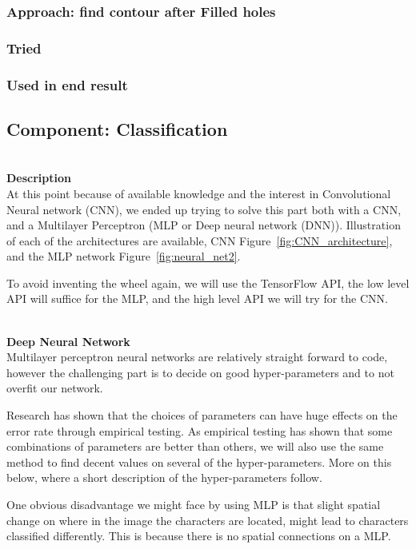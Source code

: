 \documentclass[11pt,a4paper,UKenglish]{article}
\begin{document}
\subsubsection{Approach: find contour after Filled holes}




\subsubsection{Tried}
\subsubsection{Used in end result}

\subsection{Component: Classification}
\label{Method:Classification}
\noindent \\ \textbf{Description}
\noindent \\ At this point because of available knowledge and the interest in
Convolutional Neural network (CNN), we ended up trying to solve this part
both with a CNN, and a Multilayer Perceptron (MLP or Deep neural network (DNN)).
Illustration of each of the architectures are available, CNN Figure~\ref{fig:CNN_architecture},
and the MLP network Figure~\ref{fig:neural_net2}. \par
To avoid inventing the wheel again, we will use the TensorFlow API, the low
level API will suffice for the MLP, and the high level API we will try for the
CNN.

\noindent \\ \textbf{Deep Neural Network}
\noindent \\ Multilayer perceptron neural networks are relatively straight
forward to code, however the challenging part is to decide on good
hyper-parameters and to not overfit our network. \par
Research has shown that the choices of parameters can have huge effects on
the error rate through empirical testing. As empirical testing has shown that
some combinations of parameters are better than others, we will also use the
same method to find decent values on several of the hyper-parameters. More on
this below, where a short description of the hyper-parameters follow. \par
One obvious disadvantage we might face by using MLP is that slight spatial
change on where in the image the characters are located, might lead to
characters classified differently. This is because there is no spatial
connections on a MLP.
\end{document}
